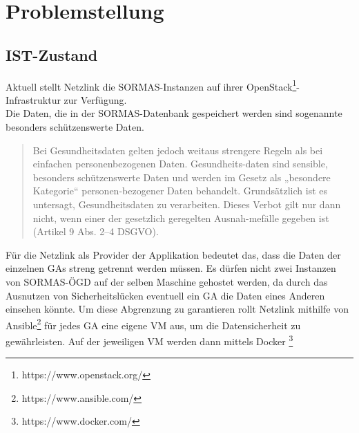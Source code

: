 \section{Problemstellung}
\subsection{IST-Zustand}
Aktuell stellt Netzlink die \ac{SORMAS}-Instanzen auf ihrer OpenStack\footnote{https://www.openstack.org/}-Infrastruktur zur Verfügung. 
\\
Die Daten, die in der \ac{SORMAS}-Datenbank gespeichert werden sind sogenannte besonders schützenswerte Daten.
\begin{quote}
    Bei Gesundheitsdaten gelten jedoch weitaus strengere Regeln als bei einfachen personenbezogenen Daten. Gesundheits-daten sind sensible, besonders schützenswerte Daten und werden im Gesetz als „besondere Kategorie“ personen-bezogener Daten behandelt. Grundsätzlich ist es untersagt, Gesundheitsdaten zu verarbeiten. Dieses Verbot gilt nur dann nicht, wenn einer der gesetzlich geregelten Ausnah-mefälle gegeben ist (Artikel 9 Abs. 2–4 DSGVO). 
    \cite{Gesundheitsdatenschutz}
\end{quote}
Für die Netzlink als Provider der Applikation bedeutet das, dass die Daten der einzelnen \ac{GAs} streng getrennt werden müssen. 
Es dürfen nicht zwei Instanzen von \ac{SORMAS-ÖGD} auf der selben Maschine gehostet werden, da durch das Ausnutzen von Sicherheitslücken eventuell ein \ac{GA} die Daten eines Anderen einsehen könnte.
Um diese Abgrenzung zu garantieren rollt Netzlink mithilfe von Ansible\footnote{https://www.ansible.com/} für jedes \ac{GA} eine eigene \ac{VM} aus, um die Datensicherheit zu gewährleisten.
Auf der jeweiligen \ac{VM} werden dann mittels Docker \footnote{https://www.docker.com/} 




